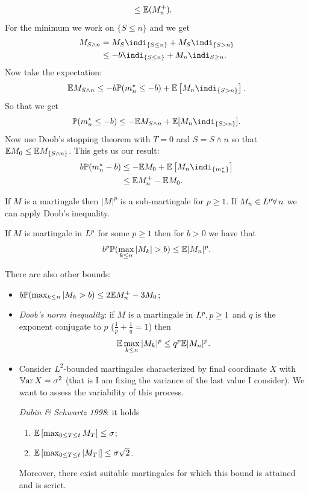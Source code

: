 \documentclass{report}
\begin{document}
\begin{fancyproof}
\begin{align*}
		&\leq\mathbb{E}(M^{+}_{n}).
	\end{align*}
	For the minimum we work on $\{S\leq n\}$ and we get 
	\begin{align*}
		M_{S\wedge n}&=M_{S}\indi_{\{S\leq n\}}+M_{S}\indi_{\{S>n\}}\\
		&\leq-b\indi_{\{S\leq n\}}+M_{n}\indi_{S\geq n}.
	\end{align*}
	Now take the expectation:
	\begin{equation*}
		\ev M_{S\wedge n}\leq-b\pr(m^{\star}_{n}\leq-b)+\ev\left[M_{n}\indi_{\{S>n\}}\right].
	\end{equation*}
	So that we get
	\begin{equation*}
		\pr(m^{\star}_{n}\leq-b)\leq-\ev M_{S\wedge n}+\ev[M_{n}\indi_{\{S>n\}}].
	\end{equation*}
	Now use Doob's stopping theorem with $T=0$ and $S=S\wedge n$ so that $\mathbb{E} M_{0}\leq\mathbb{E} M_{\{S\wedge n\}}$. This gets us our result:
	\begin{align*}
		b\pr(m^{\star}_{n}-b)&\leq-\ev M_{0}+\ev\left[M_{n}\indi_{\{m_{n}^{\star}\}}\right]\\
		&\leq\ev M^{+}_{n}-\ev M_{0}.
	\end{align*}
\end{fancyproof}
\begin{remark}
	If $M$ is a martingale then $|M|^{p}$ is a sub-martingale for $p\geq1$. If $M_{n}\in L^{p}\forall\, n$ we can apply Doob's inequality.
\end{remark}
\begin{corollary}
	If $M$ is martingale in $L^{p}$ for some $p\geq 1$ then for $b>0$ we have that
	\begin{equation*}
		b^{p}\pr(\max_{k\leq n}|M_{k}|>b)\leq\ev|M_{n}|^{p}.
	\end{equation*}
\end{corollary}
There are also other bounds:
\begin{itemize}
	\item $b\mathbb{P}(\max_{k\leq n}|M_{k}>b)\leq 2\mathbb{E} M_{n}^{+}-3M_{0}$;
	\item \emph{Doob's norm inequality}: if $M$ is a martingale in $L^{p},p\geq 1$ and $q$ is the exponent conjugate to $p$ ($\frac{1}{p}+\frac{1}{q}=1$) then
	\begin{equation*}
		\mathbb{E}\max_{  k\leq n}|M_{k}|^{p}\leq q^{p}\mathbb{E}|M_{n}|^{p}.
	\end{equation*}
	\item  Consider $L^{2}$-bounded martingales characterized by final coordinate $X$ with $\mathbb{V}\mathrm{ar}\, X=\sigma^{2}$ (that is I am fixing the variance of the last value I consider). We want to assess the variability of this process.
	\begin{theorem}
		\emph{Dubin \& Schwartz 1998}: it holds
		\begin{enumerate}
			\item $\mathbb{E}\left[\max_{0\leq T\leq t}M_{T}\right]\leq\sigma$;
			\item $\mathbb{E}\left[\max_{0\leq T\leq t}|M_{T}|\right]\leq\sigma\sqrt{2}$.
		\end{enumerate}
		Moreover, there exist suitable martingales for which this bound is attained and is scrict.
	\end{theorem}
\end{itemize}
\end{document}
